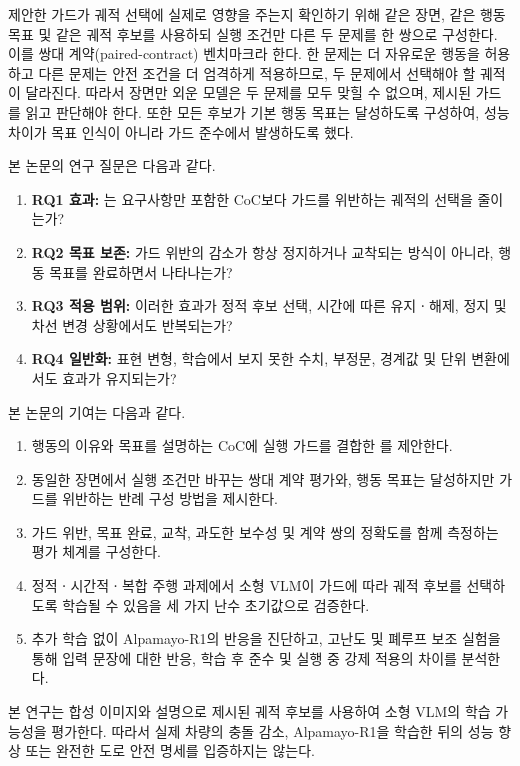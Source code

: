 제안한 가드가 궤적 선택에 실제로 영향을 주는지 확인하기 위해 같은 장면, 같은 행동 목표 및 같은 궤적 후보를 사용하되 실행 조건만 다른 두 문제를 한 쌍으로 구성한다. 이를 쌍대 계약(paired-contract) 벤치마크라 한다. 한 문제는 더 자유로운 행동을 허용하고 다른 문제는 안전 조건을 더 엄격하게 적용하므로, 두 문제에서 선택해야 할 궤적이 달라진다. 따라서 장면만 외운 모델은 두 문제를 모두 맞힐 수 없으며, 제시된 가드를 읽고 판단해야 한다. 또한 모든 후보가 기본 행동 목표는 달성하도록 구성하여, 성능 차이가 목표 인식이 아니라 가드 준수에서 발생하도록 했다.

본 논문의 연구 질문은 다음과 같다.
\begin{enumerate}
    \item \textbf{RQ1 효과:} \sccoc{}는 요구사항만 포함한 CoC보다 가드를 위반하는 궤적의 선택을 줄이는가?
    \item \textbf{RQ2 목표 보존:} 가드 위반의 감소가 항상 정지하거나 교착되는 방식이 아니라, 행동 목표를 완료하면서 나타나는가?
    \item \textbf{RQ3 적용 범위:} 이러한 효과가 정적 후보 선택, 시간에 따른 유지ㆍ해제, 정지 및 차선 변경 상황에서도 반복되는가?
    \item \textbf{RQ4 일반화:} 표현 변형, 학습에서 보지 못한 수치, 부정문, 경계값 및 단위 변환에서도 효과가 유지되는가?
\end{enumerate}

본 논문의 기여는 다음과 같다.
\begin{enumerate}
    \item 행동의 이유와 목표를 설명하는 CoC에 실행 가드를 결합한 \sccoc{}를 제안한다.
    \item 동일한 장면에서 실행 조건만 바꾸는 쌍대 계약 평가와, 행동 목표는 달성하지만 가드를 위반하는 반례 구성 방법을 제시한다.
    \item 가드 위반, 목표 완료, 교착, 과도한 보수성 및 계약 쌍의 정확도를 함께 측정하는 평가 체계를 구성한다.
    \item 정적ㆍ시간적ㆍ복합 주행 과제에서 소형 VLM이 가드에 따라 궤적 후보를 선택하도록 학습될 수 있음을 세 가지 난수 초기값으로 검증한다.
    \item 추가 학습 없이 Alpamayo-R1의 반응을 진단하고, 고난도 및 폐루프 보조 실험을 통해 입력 문장에 대한 반응, 학습 후 준수 및 실행 중 강제 적용의 차이를 분석한다.
\end{enumerate}

본 연구는 합성 이미지와 설명으로 제시된 궤적 후보를 사용하여 소형 VLM의 학습 가능성을 평가한다. 따라서 실제 차량의 충돌 감소, Alpamayo-R1을 학습한 뒤의 성능 향상 또는 완전한 도로 안전 명세를 입증하지는 않는다.
